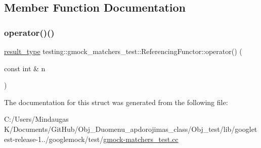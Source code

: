 \subsection{Member Function Documentation}
\mbox{\label{structtesting_1_1gmock__matchers__test_1_1_referencing_functor_a149f15ed9afbff28f5c3639c0f3eb255}} 
\subsubsection{\texorpdfstring{operator()()}{operator()()}}
{\footnotesize\ttfamily \mbox{\hyperlink{structtesting_1_1gmock__matchers__test_1_1_referencing_functor_a5856a8175e2f797a6733a363b2834094}{result\+\_\+type}} testing\+::gmock\+\_\+matchers\+\_\+test\+::\+Referencing\+Functor\+::operator() (\begin{DoxyParamCaption}\item[{const int \&}]{n }\end{DoxyParamCaption})\hspace{0.3cm}{\ttfamily [inline]}}



The documentation for this struct was generated from the following file\+:\begin{DoxyCompactItemize}
\item 
C\+:/\+Users/\+Mindaugas K/\+Documents/\+Git\+Hub/\+Obj\+\_\+\+Duomenu\+\_\+apdorojimas\+\_\+class/\+Obj\+\_\+test/lib/googletest-\/release-\/1../googlemock/test/\mbox{\hyperlink{_obj__test_2lib_2googletest-release-1_88_81_2googlemock_2test_2gmock-matchers__test_8cc}{gmock-\/matchers\+\_\+test.\+cc}}\end{DoxyCompactItemize}
